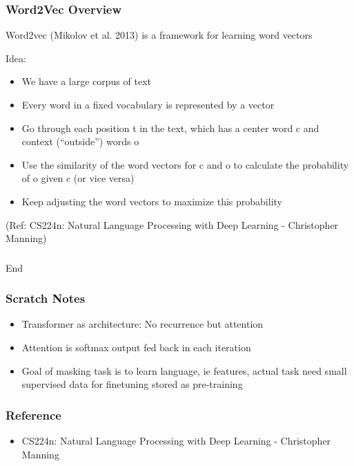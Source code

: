 \begin{frame}[fragile]\frametitle{Word2Vec Overview}
Word2vec (Mikolov et al. 2013) is a framework for learning  word vectors

Idea:
\begin{itemize}
\item We have a large corpus of text
\item Every word in a fixed vocabulary is represented by a vector
\item Go through each position t in the text, which has a center word
c and context (“outside”) words o
\item Use the similarity of the word vectors for c and o to calculate  the probability of o given c (or vice versa)
\item Keep adjusting the word vectors to maximize this probability

\end{itemize}

{\tiny (Ref: CS224n: Natural Language Processing with Deep Learning - Christopher Manning)}

\end{frame}



\begin{frame}[fragile]\frametitle{}
\begin{center}
{\Large End}
\end{center}
\end{frame}


\begin{frame}[fragile]\frametitle{Scratch Notes}

\begin{itemize}
\item Transformer as architecture: No recurrence but attention
\item Attention is softmax output fed back in each iteration
\item Goal of masking task is to learn language, ie features, actual task need small supervised data for finetuning  stored as pre-training

\end{itemize}
	  
\end{frame}

\begin{frame}[fragile]\frametitle{Reference}

\begin{itemize}
\item CS224n: Natural Language Processing with Deep Learning - Christopher Manning
\end{itemize}
	  
\end{frame}

